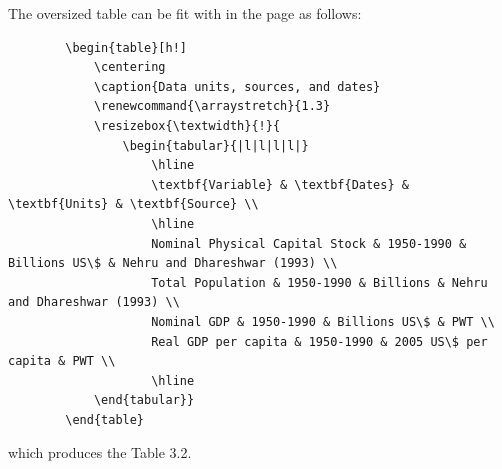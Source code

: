 \pagebreak

The oversized table can be fit with in the page as follows: 
{\scriptsize
	\begin{verbatim}
		\begin{table}[h!]
			\centering
			\caption{Data units, sources, and dates}
			\renewcommand{\arraystretch}{1.3}
			\resizebox{\textwidth}{!}{
				\begin{tabular}{|l|l|l|l|}
					\hline
					\textbf{Variable} & \textbf{Dates} & \textbf{Units} & \textbf{Source} \\
					\hline
					Nominal Physical Capital Stock & 1950-1990 & Billions US\$ & Nehru and Dhareshwar (1993) \\
					Total Population & 1950-1990 & Billions & Nehru and Dhareshwar (1993) \\
					Nominal GDP & 1950-1990 & Billions US\$ & PWT \\
					Real GDP per capita & 1950-1990 & 2005 US\$ per capita & PWT \\
					\hline
			\end{tabular}}
		\end{table}
	\end{verbatim}
}
which produces the Table 3.2.

\begin{table}[h]
\centering
\caption{Data units, sources, and dates}
\renewcommand{\arraystretch}{1.3}
\end{table}

